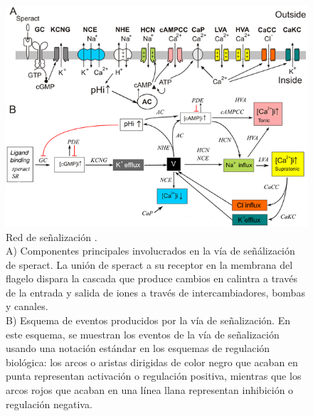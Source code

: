 \begin{figure}[hbt]
\includegraphics[width=0.9\linewidth]{gfx/redErizoBioquimica}
\caption[Red de se\~nalizaci\'on]{Red de se\~nalizaci\'on \citeauthor{Espinal2011} \citep{Espinal2011}.\\
A) Componentes principales involucrados en la vía de señálización de speract. La unión de speract a su receptor en la membrana del flagelo dispara la cascada que produce cambios en \ac{calintra} a través de la entrada y salida de iones a través de intercambiadores, bombas y canales.
\\
B) Esquema de eventos producidos por la vía de señalización. En este esquema, se muestran los eventos de la vía de señalización usando una notación estándar en los esquemas de regulación biológica: los arcos o aristas dirigidas de color negro que acaban en punta representan activación o regulación positiva, mientras que los arcos rojos que acaban en una línea llana representan inhibición o regulación negativa.}\label{fig:erizobBioquimica}
\end{figure}

